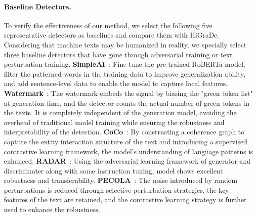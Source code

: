 \documentclass[11pt]{article}
\newcommand{\greenCitep}[1]{\textcolor{darkgreen}{\citep{#1}}}
\begin{document}
	\paragraph{Baseline Detectors.}
	To verify the effectiveness of our method, we select the following five representative detectors as baselines and compare them with HiGraDe. Considering that machine texts may be humanized in reality, we specially select three baseline detectors that have gone through adversarial training or text perturbation training. \textbf{SimpleAI}~\greenCitep{guo2023simpleai}: Fine-tune the pre-trained RoBERTa model, filter the patterned words in the training data to improve generalization ability, and add sentence-level data to enable the model to capture local features. \textbf{Watermark}~\greenCitep{kirchenbauer2023watermark}: The watermark embeds the signal by biasing the "green token list" at generation time, and the detector counts the actual number of green tokens in the texts. It is completely independent of the generation model, avoiding the overhead of traditional model training while ensuring the robustness and interpretability of the detection. \textbf{CoCo}~\greenCitep{liu2023coco}: By constructing a coherence graph to capture the entity interaction structure of the text and introducing a supervised contrastive learning framework, the model's understanding of language patterns is enhanced. \textbf{RADAR}~\greenCitep{hu2023radarrobustaitextdetection}: Using the adversarial learning framework of generator and discriminater along with some instruction tuning, model shows excellent robustness and transferability. \textbf{PECOLA}~\greenCitep{liu2024pecola}: The noise introduced by random perturbations is reduced through selective perturbation strategies, the key features of the text are retained, and the contrastive learning strategy is further used to enhance the robustness.
\end{document}

